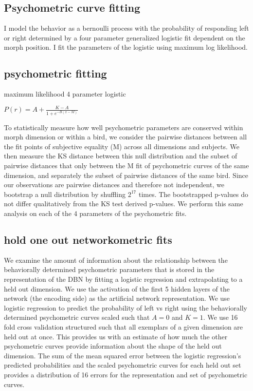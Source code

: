 \subsection{Psychometric curve fitting}
I model the behavior as a bernoulli process with the probability of responding left or right determined by a four parameter generalized logistic fit dependent on the morph position. I fit the parameters of the logistic using maximum log likelihood.

\subsection{psychometric fitting}

maximum likelihood 4 parameter logistic

$P(r) = A + \frac{K - A}{1 + e^{-B(x-M)}}$


To statistically measure how well psychometric parameters are conserved within morph dimension or within a bird, we consider the pairwise distances between all the fit points of subjective equality (M) across all dimensions and subjects. We then measure the \ac{KS} distance between this null distribution and the subset of pairwise distances that only between the M fit of psychometric curves of the same dimension, and separately the subset of pairwise distances of the same bird. Since our observations are pairwise distances and therefore not independent, we bootstrap a null distribution by shuffling $2^{17}$ times. The bootstrapped p-values do not differ qualitatively from the KS test derived p-values. We perform this same analysis on each of the 4 parameters of the psychometric fits.

\subsection{hold one out networkometric fits}

We examine the amount of information about the relationship between the behaviorally determined psychometric parameters that is stored in the representation of the \ac{DBN} by fitting a logistic regression and extrapolating to a held out dimension. We use the activation of the first 5 hidden layers of the network (the encoding side) as the artificial network representation. We use logistic regression to predict the probability of left vs right using the behaviorally determined psychometric curves scaled such that $A=0$ and $K=1$. We use 16 fold cross validation structured such that all exemplars of a given dimension are held out at once. This provides us with an estimate of how much the other psychometric curves provide information about the shape of the held out dimension. The sum of the mean squared error between the logistic regression's predicted probabilities and the scaled psychometric curves for each held out set provides a distribution of 16 errors for the representation and set of psychometric curves.


